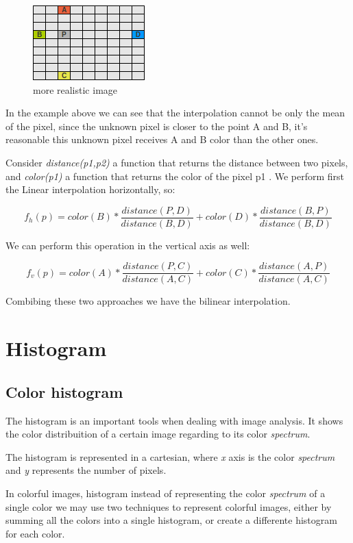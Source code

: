 \documentclass{article}
\begin{document}
	\begin{figure} [H]
		\centering
		\includegraphics[scale=1]{images/bilinear_interpolation_3}
		\caption{more realistic image\label{bilinear3}}
	\end{figure}
	
	In the example above we can see that the interpolation cannot be only the mean of the pixel, since the unknown pixel 
	is closer to the point A and B, it's reasonable 
	this unknown pixel receives A and B color than the other ones.

	Consider \textit{distance(p1,p2)} a function that returns the distance between two pixels, 
	and \textit{color(p1)} a function that returns the color of the pixel p1 . We perform first the Linear interpolation horizontally, so:

	\[ f_h(p)=color(B)*\frac{distance(P,D)}{distance(B,D)}+color(D)*\frac{distance(B,P)}{distance(B,D)}  \]

	We can perform this operation in the vertical axis as well:

	\[ f_v(p)=color(A)*\frac{distance(P,C)}{distance(A,C)}+color(C)*\frac{distance(A,P)}{distance(A,C)}  \]

	Combibing these two approaches we have the bilinear interpolation.

	
\section{Histogram}

	\subsection{Color histogram}

		The histogram is an important tools when dealing with image analysis. It shows the color distribuition of a certain image regarding to its 
		color \textit{spectrum}.
			
		The histogram is represented in a cartesian, where \textit{x} axis is the 
		color \textit{spectrum} and \textit{y} represents the number of pixels.

		In colorful images, histogram instead of representing the color \textit{spectrum} of a single color we may use two techniques
		to represent colorful images, either by summing all the colors into a single histogram, or create a differente histogram for each 
		color.
		
\end{document}
